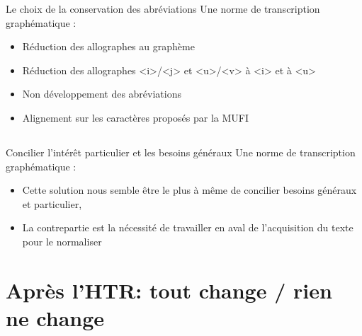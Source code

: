 \documentclass[11pt,aspectratio=169]{beamer}
\let\cite\parencite
\begin{document}
\begin{frame}{Le choix de la conservation des abréviations}
 Une norme de transcription graphématique \cite{stutzmann_PaleographieStatistiquePour_2010}:
\begin{center}
\begin{itemize}
\item Réduction des allographes au graphème
\item Réduction des allographes <i>/<j> et <u>/<v> à <i> et à <u>
\item Non développement des abréviations
\item Alignement sur les caractères proposés par la MUFI \cite{haugen_DealingGlyphsCharacters_2013}
\end{itemize}
\end{center}
\end{frame}


\subsection{}


\begin{frame}{Concilier l'intérêt particulier et les besoins généraux}
 Une norme de transcription graphématique \cite{stutzmann_PaleographieStatistiquePour_2010}:
\begin{center}
\begin{itemize}
\item Cette solution nous semble être le plus à même de concilier besoins généraux et particulier,
\item La contrepartie est la nécessité de travailler en aval de l'acquisition du texte pour le normaliser
\end{itemize}
\end{center}
\end{frame}

\section{Après l'HTR: tout change / rien ne change}
\end{document}
